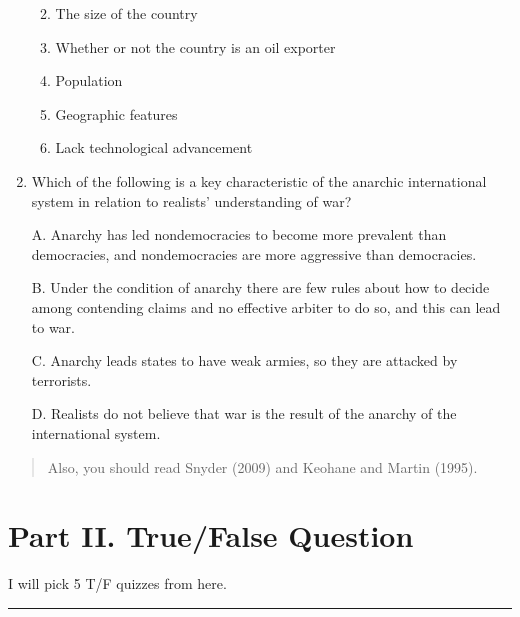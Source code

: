 \documentclass[
]{book}
\begin{document}
\begin{enumerate}
  \begin{enumerate}
  \def\labelenumii{\Alph{enumii}.}
  \item
    The size of the country
  \item
    Whether or not the country is an oil exporter
  \item
    Population
  \item
    Geographic features
  \item
    Lack technological advancement
  \end{enumerate}
\item
  Which of the following is a key characteristic of the anarchic international system in relation to realists' understanding of war?

  A. Anarchy has led nondemocracies to become more prevalent than democracies, and nondemocracies are more aggressive than democracies.

  B. Under the condition of anarchy there are few rules about how to decide among contending claims and no effective arbiter to do so, and this can lead to war.

  C. Anarchy leads states to have weak armies, so they are attacked by terrorists.

  D. Realists do not believe that war is the result of the anarchy of the international system.
\end{enumerate}

\begin{quote}
Also, you should read Snyder (2009) and Keohane and Martin (1995).
\end{quote}

\hypertarget{part-ii.-truefalse-question}{%
\section*{Part II. True/False Question}\label{part-ii.-truefalse-question}}

I will pick 5 T/F quizzes from here.

\begin{center}\rule{0.5\linewidth}{0.5pt}\end{center}
\end{document}
